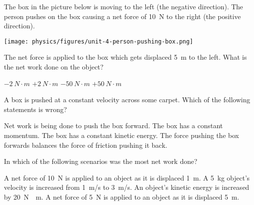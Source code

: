 \documentclass[answers]{exam}
\begin{document}
\begin{questions}


\question
The box in the picture below is moving to the left (the negative direction). The person pushes on the box causing a net force of \SI{10}{N} to the right (the positive direction).

\begin{center}
    \texttt{[image: physics/figures/unit-4-person-pushing-box.png]}
\end{center}

The net force is applied to the box which gets displaced \SI{5}{m} to the left.  What is the net work done on the object? 

\begin{randomizeoneparchoices}[norandomize]
    \choice $-\SI{2}{N\cdot m}$
    \choice $+\SI{2}{N\cdot m}$
    \correctchoice $-\SI{50}{N\cdot m}$
    \choice $+\SI{50}{N\cdot m}$
\end{randomizeoneparchoices}

\clearpage

\question
A box is pushed at a constant velocity across some carpet.  Which of the following statements is wrong?

\begin{randomizechoices}[norandomize]
    \correctchoice Net work is being done to push the box forward.
    \choice The box has a constant momentum.
    \choice The box has a constant kinetic energy.
    \choice The force pushing the box forwards balances the force of friction pushing it back.
\end{randomizechoices}

\question
In which of the following scenarios was the most net work done?

\begin{randomizechoices}[norandomize]
    \choice A net force of \SI{10}{N} is applied to an object as it is displaced \SI{1}{m}.
    \choice A \SI{5}{kg} object's velocity is increased from \SI{1}{m/s} to \SI{3}{m/s}.
    \choice An object's kinetic energy is increased by \SI{20}{N\cdot m}.
    \correctchoice A net force of \SI{5}{N} is applied to an object as it is displaced \SI{5}{m}.
\end{randomizechoices}


\end{questions}
\end{document}
